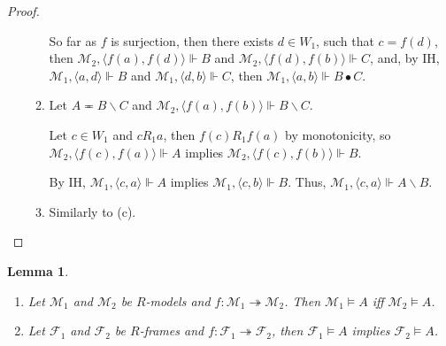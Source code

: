 \documentclass[a4paper]{article}
\theoremstyle{defin}
\theoremstyle{theorem}
\theoremstyle{prop}
\theoremstyle{lemma}
\newtheorem{lemma}{Lemma}
\theoremstyle{ex}
\theoremstyle{col}
\begin{document}
\begin{proof}
\begin{enumerate}
\begin{enumerate}
      So far as $f$ is surjection, then there exists $d \in W_1$, such that
      $c = f(d)$, then $\mathcal{M}_2, \langle f(a), f(d) \rangle \Vdash B$ and
      $\mathcal{M}_2, \langle f(d), f(b) \rangle \Vdash C$, and, by IH,
      $\mathcal{M}_1, \langle a, d \rangle \Vdash B$ and $\mathcal{M}_1, \langle d, b \rangle \Vdash C$,
      then $\mathcal{M}_1, \langle a, b \rangle \Vdash B \bullet C$.

      \item Let $A \eqcirc B \backslash C$ and $\mathcal{M}_2, \langle f(a), f(b) \rangle \Vdash B \backslash C$.

      Let $c \in W_1$ and $c R_1 a$, then $f(c) R_1 f(a)$ by monotonicity,
      so $\mathcal{M}_2, \langle f(c), f(a) \rangle \Vdash A$ implies
      $\mathcal{M}_2, \langle f(c), f(b) \rangle \Vdash B$.

      By IH, $\mathcal{M}_1, \langle c, a \rangle \Vdash A$ implies
      $\mathcal{M}_1, \langle c, b \rangle \Vdash B$. Thus, $\mathcal{M}_1, \langle c, a \rangle \Vdash A \backslash B$.
      \item Similarly to (c).
    \end{enumerate}
  \end{enumerate}
\end{proof}

\begin{lemma}
$ $

  \begin{enumerate}
    \item Let $\mathcal{M}_1$ and $\mathcal{M}_2$ be $R$-models and $f : \mathcal{M}_1 \twoheadrightarrow \mathcal{M}_2$.
    Then $\mathcal{M}_1 \models A$ iff $\mathcal{M}_2 \models A$.

    \item Let $\mathcal{F}_1$ and $\mathcal{F}_2$ be $R$-frames and $f : \mathcal{F}_1 \twoheadrightarrow \mathcal{F}_2$,
    then $\mathcal{F}_1 \models A$ implies $\mathcal{F}_2 \models A$.
  \end{enumerate}
\end{lemma}
\end{document}
